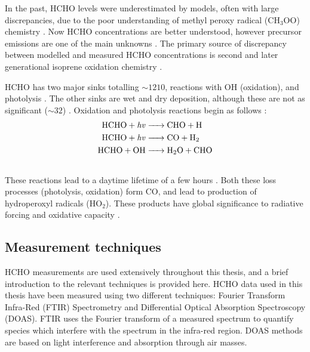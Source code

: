     In the past, HCHO levels were underestimated by models, often with large discrepancies, due to the poor understanding of methyl peroxy radical (CH$_3$OO) chemistry \parencite{Wagner2002}.
    Now HCHO concentrations are better understood, however precursor 
    emissions are one of the main unknowns 
    \parencite[e.g.,][]{Emmerson2016,Marvin2017}.
    The primary source of discrepancy between modelled and measured HCHO concentrations is second and later generational isoprene oxidation chemistry \parencite{Marvin2017}.

    HCHO has two major sinks totalling $\sim 1210$\tgpyr, reactions with OH (oxidation), and photolysis \parencite{Levy1972, Crutzen1999, Wagner2002, FortemsCheiney2012, Kefauver2014}.
    The other sinks are wet and dry deposition, although these are not as significant ($\sim 32$\tgpyr) \parencite{Atkinson2000,FortemsCheiney2012}.
    Oxidation and photolysis reactions begin as follows \parencite{Ayers1997}:
    \begin{align*} %
      \label{Model:GC:Mechanisms:eqn_mechanisms}
        \ce{ 
          HCHO + \mathit{hv} -> & CHO + H \\ 
          HCHO + \mathit{hv} -> & CO + H2 \\ 
          HCHO + OH -> & H2O + CHO \\ 
        }
    \end{align*}
    These reactions lead to a daytime lifetime of a few hours \parencite{Atkinson2000, Millet2006}.
    Both these loss processes (photolysis, oxidation) form CO, and lead to production of hydroperoxyl radicals (HO$_2$).
    These products have global significance to radiative forcing and oxidative capacity \parencite{Franco2015}.
    
    
  \subsection{Measurement techniques}
    \label{LR:HCHO:Measurements}
    HCHO measurements are used extensively throughout this thesis, and a brief introduction to the relevant techniques is provided here.
    HCHO data used in this thesis have been measured using two different techniques: Fourier Transform Infra-Red (FTIR) Spectrometry and Differential Optical Absorption Spectroscopy (DOAS).
    FTIR uses the Fourier transform of a measured spectrum to quantify species which interfere with the spectrum in the infra-red region.
    DOAS methods are based on light interference and absorption through air masses.
    
